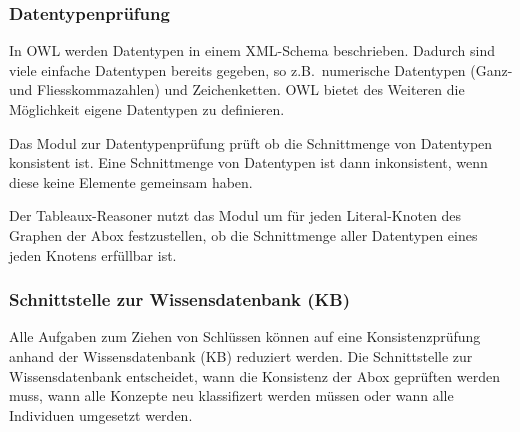 %
%
%

%


\subsubsection{Datentypenprüfung}
\label{ssubsection:inferenz_pellet_datatypes}
In OWL werden Datentypen in einem XML-Schema beschrieben. Dadurch sind viele einfache Datentypen bereits gegeben, so z.B.\ numerische Datentypen (Ganz- und Fliesskommazahlen) und Zeichenketten. OWL bietet des Weiteren die Möglichkeit eigene Datentypen zu definieren.

Das Modul zur Datentypenprüfung prüft ob die Schnittmenge von Datentypen konsistent ist. Eine Schnittmenge von Datentypen ist dann inkonsistent, wenn diese keine Elemente gemeinsam haben.

Der Tableaux-Reasoner nutzt das Modul um für jeden Literal-Knoten des Graphen der Abox festzustellen, ob die Schnittmenge aller Datentypen eines jeden Knotens erfüllbar ist.

\subsubsection{Schnittstelle zur Wissensdatenbank (KB)}
\label{ssubsection:inferenz_pellet_kb}
Alle Aufgaben zum Ziehen von Schlüssen können auf eine Konsistenzprüfung anhand der Wissensdatenbank (KB) reduziert werden. Die Schnittstelle zur Wissensdatenbank entscheidet, wann die Konsistenz der Abox geprüften werden muss, wann alle Konzepte neu klassifizert werden müssen oder wann alle Individuen umgesetzt werden. %

